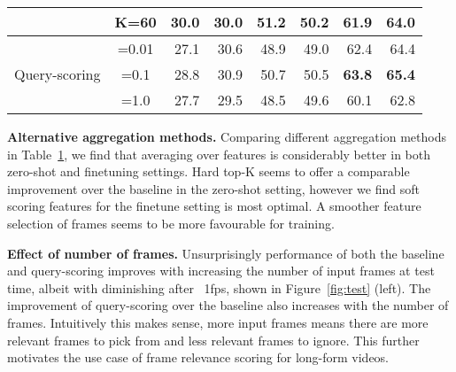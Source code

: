 \begin{table}[t]
\begin{tabular}{@{}ccrrrrrr@{}}
& K=60                       & 30.0                   & 30.0                        &  51.2                     &  50.2                        &  61.9                         &  64.0                           \\ \midrule
\multirow{3}{*}{Query-scoring}                           & =0.01                    &  27.1                  & 30.6                        & 48.9                          & 49.0                     & 62.4                           & 64.4                            \\
                                                                                   & =0.1                      &  28.8                 & 30.9                        & 50.7                          & 50.5                      &  \textbf{63.8}                         & \textbf{65.4}                           \\
                                                                                   & =1.0                      &  27.7                 & 29.5                        &  48.5                        &  49.6                      & 60.1                          &  62.8                           \\ \bottomrule
\end{tabular}
\label{tab:scoring_compare}
\end{table} \noindent\textbf{Alternative aggregation methods.} Comparing different aggregation methods in Table~\ref{tab:scoring_compare}, we find that averaging over features is considerably better in both zero-shot and finetuning settings. Hard top-K seems to offer a comparable improvement over the baseline in the zero-shot setting, however we find soft scoring features for the finetune setting is most optimal. A smoother feature selection of frames seems to be more favourable for training. 

\noindent\textbf{Effect of number of frames.}
Unsurprisingly performance of both the baseline and query-scoring improves with increasing the number of input frames at test time, albeit with diminishing after ~1fps, shown in Figure~\ref{fig:test} (left). The improvement of query-scoring over the baseline also increases with the number of frames. Intuitively this makes sense, more input frames means there are more relevant frames to pick from and less relevant frames to ignore. This further motivates the use case of frame relevance scoring for long-form videos.

